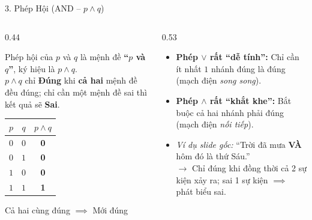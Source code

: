 \documentclass[aspectratio=169, 10pt]{beamer}
\begin{document}
\begin{frame}{3. Phép Hội (AND -- $p \land q$)}
  \begin{columns}[t, onlytextwidth]
    \begin{column}{0.44\textwidth}
      \begin{cozyDef}
        \small
        Phép hội của $p$ và $q$ là mệnh đề \textbf{``$p$ và $q$''}, ký hiệu là $p \land q$.\\
        \vspace{0.05cm}
        $p \land q$ chỉ \textbf{\textcolor{cozyTrue}{Đúng}} khi \textbf{cả hai} mệnh đề đều đúng; chỉ cần một mệnh đề sai thì kết quả sẽ \textbf{\textcolor{cozyFalse}{Sai}}.
        \vspace{0.15cm}
        \begin{center}
          \renewcommand{\arraystretch}{1.1}
          \begin{tabular}{cc|c}
            \toprule
            $p$ & $q$ & $p \land q$ \\
            \midrule
            $0$ & $0$ & \textbf{\textcolor{cozyFalse}{0}} \\
            $0$ & $1$ & \textbf{\textcolor{cozyFalse}{0}} \\
            $1$ & $0$ & \textbf{\textcolor{cozyFalse}{0}} \\
            $1$ & $1$ & \textbf{\textcolor{cozyTrue}{1}} \\
            \bottomrule
          \end{tabular}
        \end{center}
        \vspace{0.05cm}
        \par\footnotesize\centering\color{cozyMuted}Cả hai cùng đúng $\implies$ Mới đúng
      \end{cozyDef}
    \end{column}
    \begin{column}{0.53\textwidth}
      \begin{cozyMethod}
        \small
        \begin{itemize}
          \setlength{\itemsep}{3pt}
          \item \textbf{Phép $\lor$ rất ``dễ tính'':} Chỉ cần ít nhất $1$ nhánh đúng là đúng (mạch điện \textit{song song}).
          \item \textbf{Phép $\land$ rất ``khắt khe'':} Bắt buộc cả hai nhánh phải đúng (mạch điện \textit{nối tiếp}).
          \item \textit{Ví dụ slide gốc:} ``Trời đã mưa \textbf{VÀ} hôm đó là thứ Sáu.''\\
          $\to$ Chỉ đúng khi đồng thời cả 2 sự kiện xảy ra; sai 1 sự kiện $\implies$ phát biểu sai.
        \end{itemize}
      \end{cozyMethod}
    \end{column}
  \end{columns}
\end{frame}
\end{document}

